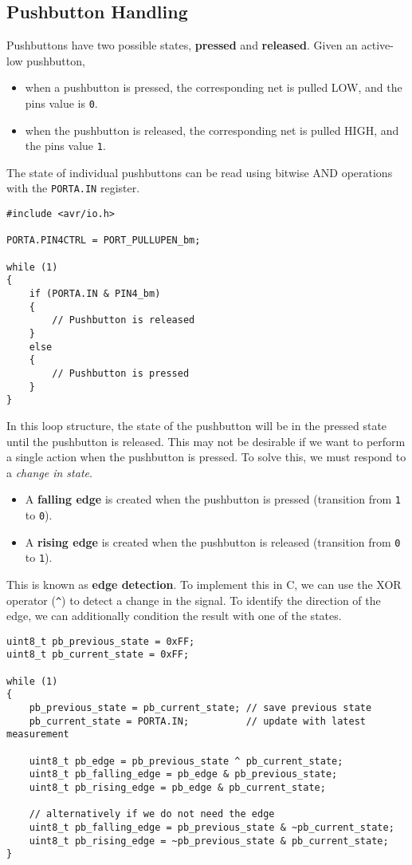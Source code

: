 \documentclass{article}
\begin{document}
\subsection{Pushbutton Handling}
Pushbuttons have two possible states, \textbf{pressed} and
\textbf{released}. Given an active-low pushbutton,
\begin{itemize}
    \item when a pushbutton is pressed, the corresponding net is pulled
          LOW, and the pins value is \texttt{0}.
    \item when the pushbutton is released, the corresponding net is
          pulled HIGH, and the pins value \texttt{1}.
\end{itemize}
The state of individual pushbuttons can be read using bitwise AND
operations with the \texttt{PORTA.IN} register.
\begin{verbatim}
#include <avr/io.h>

PORTA.PIN4CTRL = PORT_PULLUPEN_bm;

while (1)
{
    if (PORTA.IN & PIN4_bm)
    {
        // Pushbutton is released
    }
    else
    {
        // Pushbutton is pressed
    }
}
\end{verbatim}
In this loop structure, the state of the pushbutton will be in the
pressed state until the pushbutton is released. This may not be
desirable if we want to perform a single action when the pushbutton is
pressed. To solve this, we must respond to a \textit{change in state}.
\begin{itemize}
    \item A \textbf{falling edge} is created when the pushbutton is
          pressed (transition from \texttt{1} to
          \texttt{0}).
    \item A \textbf{rising edge} is created when the pushbutton is
          released (transition from \texttt{0} to
          \texttt{1}).
\end{itemize}
This is known as \textbf{edge detection}. To implement this in C, we can
use the XOR operator (\texttt{^}) to detect a change in the
signal. To identify the direction of the edge, we can additionally
condition the result with one of the states.
\begin{verbatim}
uint8_t pb_previous_state = 0xFF;
uint8_t pb_current_state = 0xFF;

while (1)
{
    pb_previous_state = pb_current_state; // save previous state
    pb_current_state = PORTA.IN;          // update with latest measurement

    uint8_t pb_edge = pb_previous_state ^ pb_current_state;
    uint8_t pb_falling_edge = pb_edge & pb_previous_state;
    uint8_t pb_rising_edge = pb_edge & pb_current_state;

    // alternatively if we do not need the edge
    uint8_t pb_falling_edge = pb_previous_state & ~pb_current_state;
    uint8_t pb_rising_edge = ~pb_previous_state & pb_current_state;
}
\end{verbatim}
\end{document}
